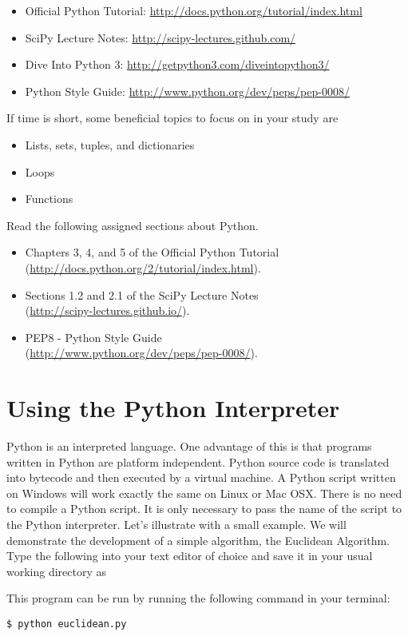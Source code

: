 \begin{itemize}
\item Official Python Tutorial: \url{http://docs.python.org/tutorial/index.html}
\item SciPy Lecture Notes: \url{http://scipy-lectures.github.com/}
\item Dive Into Python 3: \url{http://getpython3.com/diveintopython3/}
\item Python Style Guide: \url{http://www.python.org/dev/peps/pep-0008/}
\end{itemize}
If time is short, some beneficial topics to focus on in your study are
\begin{itemize}
\item Lists, sets, tuples, and dictionaries
\item Loops
\item Functions
\end{itemize}

\begin{problem}
Read the following assigned sections about Python.
\begin{itemize}
\item Chapters 3, 4, and 5 of the Official Python Tutorial \\ (\url{http://docs.python.org/2/tutorial/index.html}).
\item Sections 1.2 and 2.1 of the SciPy Lecture Notes \\ (\url{http://scipy-lectures.github.io/}).
\item PEP8 - Python Style Guide \\ (\url{http://www.python.org/dev/peps/pep-0008/}).
\end{itemize}
\end{problem}

\section*{Using the Python Interpreter}
Python is an interpreted language.
One advantage of this is that programs written in Python are platform independent. 
Python source code is translated into bytecode and then executed by a virtual machine.
A Python script written on Windows will work exactly the same on Linux or Mac OSX.
There is no need to compile a Python script.
It is only necessary to pass the name of the script to the Python interpreter. 
Let's illustrate with a small example.
We will demonstrate the development of a simple algorithm, the Euclidean Algorithm.
Type the following into your text editor of choice and save it in your usual working directory as 

This program can be run by running the following command in your terminal:
\begin{lstlisting}
$ python euclidean.py
\end{lstlisting}

